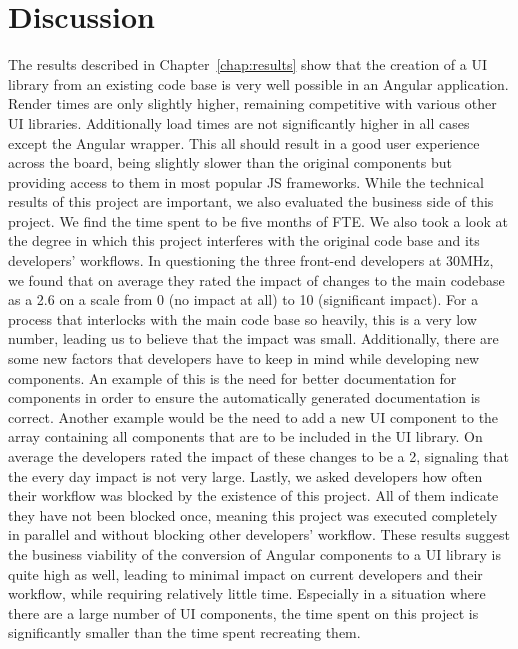 \chapter{Discussion}\label{chap:discussion}

The results described in Chapter~\ref{chap:results} show that the creation of a UI library from an existing code base is very well possible in an Angular application. Render times are only slightly higher, remaining competitive with various other UI libraries. Additionally load times are not significantly higher in all cases except the Angular wrapper. This all should result in a good user experience across the board, being slightly slower than the original components but providing access to them in most popular JS frameworks.
While the technical results of this project are important, we also evaluated the business side of this project. We find the time spent to be five months of FTE\@. We also took a look at the degree in which this project interferes with the original code base and its developers' workflows. In questioning the three front-end developers at 30MHz, we found that on average they rated the impact of changes to the main codebase as a 2.6 on a scale from 0 (no impact at all) to 10 (significant impact). For a process that interlocks with the main code base so heavily, this is a very low number, leading us to believe that the impact was small. Additionally, there are some new factors that developers have to keep in mind while developing new components. An example of this is the need for better documentation for components in order to ensure the automatically generated documentation is correct. Another example would be the need to add a new UI component to the array containing all components that are to be included in the UI library. On average the developers rated the impact of these changes to be a 2, signaling that the every day impact is not very large. Lastly, we asked developers how often their workflow was blocked by the existence of this project. All of them indicate they have not been blocked once, meaning this project was executed completely in parallel and without blocking other developers' workflow. These results suggest the business viability of the conversion of Angular components to a UI library is quite high as well, leading to minimal impact on current developers and their workflow, while requiring relatively little time. Especially in a situation where there are a large number of UI components, the time spent on this project is significantly smaller than the time spent recreating them.

